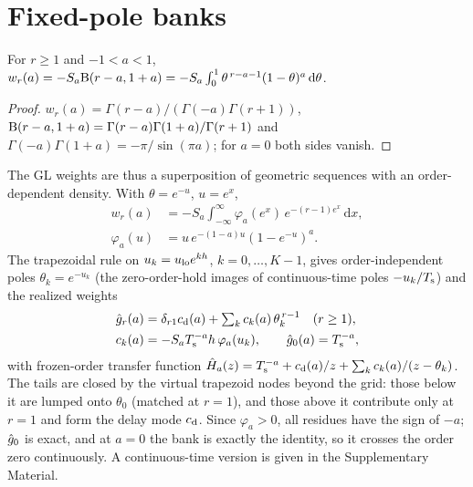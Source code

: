 \section{Fixed-pole banks}\label{sec:bank}

\begin{lemma}\label{lem:beta}
For $r\ge1$ and $-1<a<1$, $w_r(a)=-S_a\mathrm{B}(r-a,1+a)=-S_a\int_0^1\theta^{\,r-a-1}(1-\theta)^{a}\,\mathrm d\theta$.
\end{lemma}
\begin{proof}
$w_r(a)=\Gamma(r-a)/(\Gamma(-a)\Gamma(r+1))$, $\mathrm{B}(r-a,1+a)=\Gamma(r-a)\Gamma(1+a)/\Gamma(r+1)$ and $\Gamma(-a)\Gamma(1+a)=-\pi/\sin(\pi a)$; for $a=0$ both sides vanish.
\end{proof}

The GL weights are thus a superposition of geometric sequences with an order-dependent density. With $\theta=e^{-u}$, $u=e^{x}$,
\begin{equation}
\begin{aligned}
w_r(a)&=-S_a\int_{-\infty}^{\infty}\varphi_a(e^{x})\,e^{-(r-1)e^{x}}\,\mathrm dx,\\
\varphi_a(u)&=u\,e^{-(1-a)u}(1-e^{-u})^{a}.
\end{aligned}\label{eq:betax}
\end{equation}
The trapezoidal rule on $u_k=u_{\mathrm{lo}} e^{kh}$, $k=0,\dots,K-1$, gives order-independent poles $\theta_k=e^{-u_k}$ (the zero-order-hold images of continuous-time poles $-u_k/T_{\mathrm{s}}$) and the realized weights
\begin{equation}
\begin{aligned}
\hat g_r(a)&=\delta_{r1}c_{\mathrm{d}}(a)+\textstyle\sum_{k}c_k(a)\,\theta_k^{\,r-1}\quad(r\ge1),\\
c_k(a)&=-S_aT_{\mathrm{s}}^{-a}h\,\varphi_a(u_k),\qquad \hat g_0(a)=T_{\mathrm{s}}^{-a},
\end{aligned}\label{eq:dtweights}
\end{equation}
with frozen-order transfer function $\hat H_a(z)=T_{\mathrm{s}}^{-a}+c_{\mathrm{d}}(a)/z+\sum_kc_k(a)/(z-\theta_k)$. The tails are closed by the virtual trapezoid nodes beyond the grid: those below it are lumped onto $\theta_0$ (matched at $r=1$), and those above it contribute only at $r=1$ and form the delay mode $c_{\mathrm{d}}$. Since $\varphi_a>0$, all residues have the sign of $-a$; $\hat g_0$ is exact, and at $a=0$ the bank is exactly the identity, so it crosses the order zero continuously. A continuous-time version is given in the Supplementary Material.

